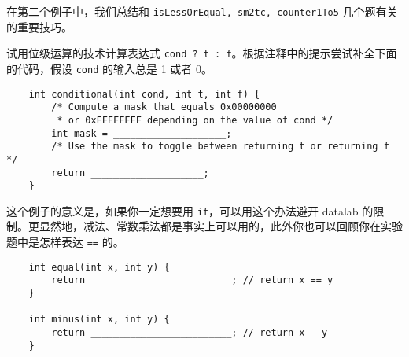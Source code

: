     在第二个例子中，我们总结和 \texttt{isLessOrEqual, sm2tc, counter1To5} 几个题有关的重要技巧。
    \begin{example}[选择器]
        试用位级运算的技术计算表达式 \texttt{cond ? t : f}。根据注释中的提示尝试补全下面的代码，假设 \texttt{cond} 的输入总是 1 或者 0。
        \begin{verbatim}
    int conditional(int cond, int t, int f) {
        /* Compute a mask that equals 0x00000000
         * or 0xFFFFFFFF depending on the value of cond */
        int mask = ____________________;
        /* Use the mask to toggle between returning t or returning f */
        return ____________________;
    }
        \end{verbatim}
        这个例子的意义是，如果你一定想要用 \texttt{if}，可以用这个办法避开 datalab 的限制。更显然地，减法、常数乘法都是事实上可以用的，此外你也可以回顾你在实验题中是怎样表达 \texttt{==} 的。
        \begin{verbatim}
    int equal(int x, int y) {
        return _________________________; // return x == y
    }

    int minus(int x, int y) {
        return _________________________; // return x - y
    }
        \end{verbatim}
    \end{example}

